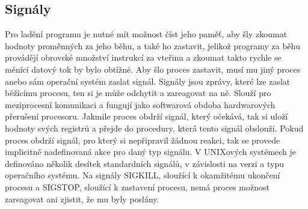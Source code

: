 \documentclass[bc,male,java,dept460]{diploma}						%
\begin{document}
	\subsection{Signály}
		Pro ladění programu je nutné mít možnost číst jeho paměť, aby šly zkoumat hodnoty proměnných za jeho běhu, a také ho zastavit, jelikož
		programy za běhu provádějí obrovské množství instrukcí za vteřinu a zkoumat takto rychle se měnící datový tok by bylo obtížné.
		Aby šlo proces zastavit, musí mu jiný proces anebo sám operační systém zaslat signál.
		Signály jsou zprávy, které lze zaslat běžícímu procesu, ten si je může odchytit a zareagovat na ně.\cite[21]{tanenbaum}
		Slouží pro meziprocesní komunikaci a fungují jako softwarová obdoba hardwarových přerušení procesoru.
		Jakmile proces obdrží signál, který očekává, tak si uloží hodnoty svých registrů a přejde do procedury, která tento signál obslouží.
		Pokud proces obdrží signál, pro který si nepřipravil žádnou reakci, tak se provede implicitně nadefinovaná akce pro daný typ signálu.
		V UNIXových systémech je definováno několik desítek standardních signálů, v závislosti na verzi a typu operačního systému.
		Na signály SIGKILL, sloužící k okamžitému ukončení procesu a SIGSTOP, sloužící k zastavení procesu, nemá proces možnost zareagovat ani
		zjistit, že mu byly poslány.
	
\end{document}
